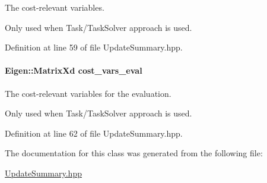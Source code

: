The cost-\/relevant variables. 

Only used when Task/\+Task\+Solver approach is used. 

Definition at line 59 of file Update\+Summary.\+hpp.

\hypertarget{classDmpBbo_1_1UpdateSummary_a309e381520075afa088c97bf1e7e6cd0}{
\paragraph[{cost\+\_\+vars\+\_\+eval}]{\setlength{\rightskip}{0pt plus 5cm}Eigen\+::\+Matrix\+Xd cost\+\_\+vars\+\_\+eval}}\label{classDmpBbo_1_1UpdateSummary_a309e381520075afa088c97bf1e7e6cd0}


The cost-\/relevant variables for the evaluation. 

Only used when Task/\+Task\+Solver approach is used. 

Definition at line 62 of file Update\+Summary.\+hpp.



The documentation for this class was generated from the following file\+:\begin{DoxyCompactItemize}
\item 
\hyperlink{UpdateSummary_8hpp}{Update\+Summary.\+hpp}\end{DoxyCompactItemize}

